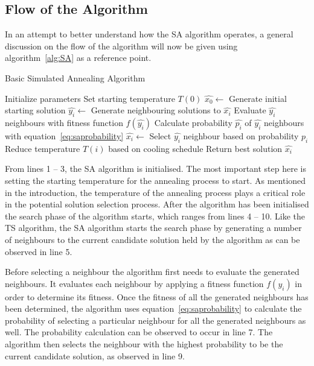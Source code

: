 \subsection{Flow of the Algorithm}
In an attempt to better understand how the \gls{SA} algorithm operates, a general discussion on the flow of the algorithm will now be given using algorithm~\ref{alg:SA} as a reference point.
\begin{algorithm}[H]
\caption{Basic Simulated Annealing Algorithm\cite{VeryFastSAImageEnchancement,ChaosSA}}
\label{alg:SA}
	\begin{algorithmic}[1]
		\State Initialize parameters
		\State Set starting temperature $T(0)$
    \State $\hat{x_0} \leftarrow$ Generate initial starting solution
    \State $\hat{y_i} \leftarrow$ Generate neighbouring solutions to $\hat{x_i}$
    \State Evaluate $\hat{y_i}$ neighbours with fitness function $f(\hat{y_i})$
    \State Calculate probability $\hat{p_i}$ of $\hat{y_i}$ neighbours with equation~\ref{eq:saprobability}
    \State $\hat{x_i} \leftarrow$ Select $\hat{y_i}$ neighbour based on probability $p_i$
			\State Reduce temperature $T(i)$ based on cooling schedule
		\EndWhile
    \State Return best solution $\hat{x_i}$
	\end{algorithmic}
\end{algorithm}

From lines 1 -- 3, the \gls{SA} algorithm is initialised. The most important step here is setting the starting temperature for the annealing process to start. As mentioned in the introduction, the temperature of the annealing process plays a critical role in the potential solution selection process. After the algorithm has been initialised the search phase of the algorithm starts, which ranges from lines 4 -- 10. Like the \gls{TS} algorithm, the \gls{SA} algorithm starts the search phase by generating a number of neighbours to the current candidate solution held by the algorithm as can be observed in line 5.

Before selecting a neighbour the algorithm first needs to evaluate the generated neighbours. It evaluates each neighbour by applying a fitness function $f(y_i)$ in order to determine its fitness.
Once the fitness of all the generated neighbours has been determined, the algorithm uses equation~\ref{eq:saprobability} to calculate the probability of selecting a particular neighbour for all the generated neighbours as well. The probability calculation can be observed to occur in line 7. The algorithm then selects the neighbour with the highest probability to be the current candidate solution, as observed in line 9. 

